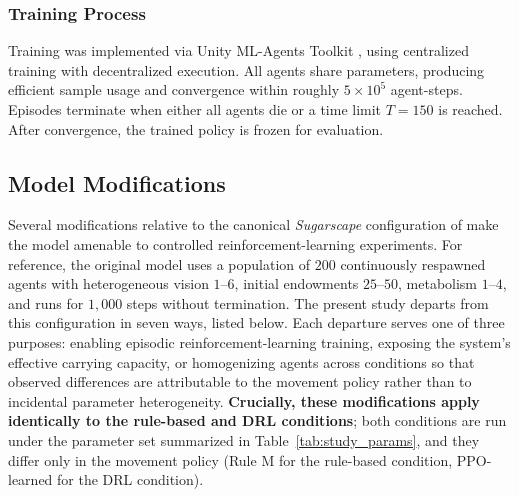\documentclass[pdflatex,sn-mathphys-num]{sn-jnl}%
\theoremstyle{thmstyleone}%
\theoremstyle{thmstyletwo}%
\theoremstyle{thmstylethree}%
\begin{document}
\subsubsection{Training Process}
Training was implemented via Unity ML-Agents Toolkit \citep{Unity2025}, using centralized training with decentralized execution.  
All agents share parameters, producing efficient sample usage and convergence within roughly \(5\times10^5\) agent-steps.  
Episodes terminate when either all agents die or a time limit \(T=150\) is reached.  
After convergence, the trained policy is frozen for evaluation.

\subsection{Model Modifications}

Several modifications relative to the canonical \textit{Sugarscape} configuration of \citet{EpsteinAxtell1996} make the model amenable to controlled reinforcement-learning experiments.  
For reference, the original model uses a population of $200$ continuously respawned agents with heterogeneous vision $1$--$6$, initial endowments $25$--$50$, metabolism $1$--$4$, and runs for $1{,}000$ steps without termination.  
The present study departs from this configuration in seven ways, listed below.  
Each departure serves one of three purposes: enabling episodic reinforcement-learning training, exposing the system's effective carrying capacity, or homogenizing agents across conditions so that observed differences are attributable to the movement policy rather than to incidental parameter heterogeneity.  
\textbf{Crucially, these modifications apply identically to the rule-based and DRL conditions}; both conditions are run under the parameter set summarized in Table~\ref{tab:study_params}, and they differ only in the movement policy (Rule M for the rule-based condition, PPO-learned for the DRL condition).
\end{document}
